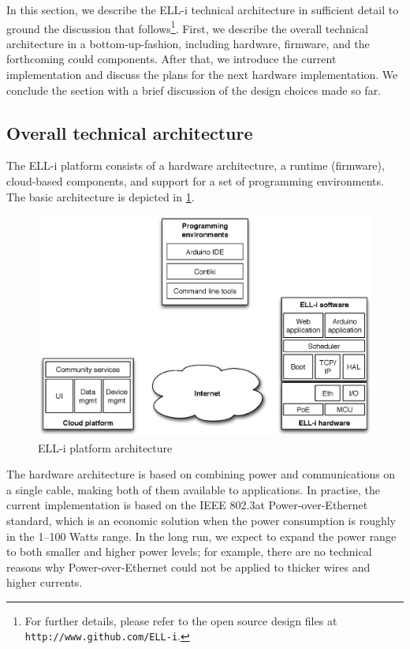 \documentclass[final]{siamltex}
\begin{document}
In this section, we describe the ELL-i technical architecture in
sufficient detail to ground the discussion that follows\footnote{For further
details, please refer to the open source design files at
\hbox{\tt http://www.github.com/ELL-i}.}.
First, we describe the overall technical architecture in a
bottom-up-fashion, including hardware, firmware, and the forthcoming
could components.  After that, we introduce the current
implementation and discuss the plans for the next hardware implementation.  We
conclude the section with a brief discussion of the design choices
made so far.

\subsection{Overall technical architecture}

The ELL-i platform consists of a hardware architecture, a runtime
(firmware), cloud-based components, and support for a set of
programming environments.  The basic architecture is depicted in
\ref{fig:arch}.

\begin{figure}
\centering
\includegraphics[scale=.55]{figure-arch.eps}
\caption{ELL-i platform architecture}
\label{fig:arch}
\end{figure}

The hardware architecture is based on combining power and
communications on a single cable, making both of them available to
applications.  In practise, the current implementation is based on the
IEEE 802.3at Power-over-Ethernet standard, which is an economic
solution when the power consumption is roughly in the 1--100 Watts
range.  In the long run, we expect to expand the power range to both
smaller and higher power levels; for example, there are no technical
reasons why Power-over-Ethernet could not be applied to thicker wires
and higher currents.
\end{document}
